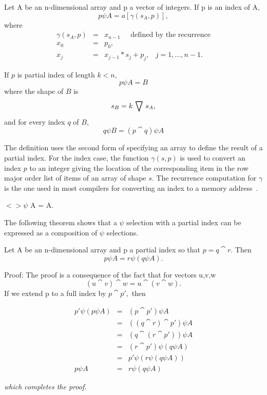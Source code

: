 \begin{definition}
Let A be an n-dimensional array and p a vector of integers.
If p is an index of A, 
\[             p \psi A = a[\gamma(s_A,p)], \]
   where 
\begin{eqnarray}
      \gamma(s_A,p) & = & x_{n-1}  \;\;\;\;\; \mbox{defined by 
the recurrence}    \nonumber \\ 
                 x_0 & = & p_0, \nonumber \\ 
              x_j & = & x_{j-1} * s_j + p_j, \; \; \; j=1,...,n-1. \nonumber
\end{eqnarray}

If $p$ is partial index of length $k < n,$
\[             p \psi A = B \]
where the shape of $B$ is
\[         s_B = k \,\bigtriangledown\, s_A,    \] 
and for every index $q$ of $B$,
\[         q \psi B = (p \cat q) \psi A \]
\end{definition}
The definition uses the second form of specifying an array to define the result
of a partial index. For the index case, the function $\gamma(s,p)$ 
is used to convert an index $p$ to an
integer giving the location of the corresponding item 
in the row major order list of items of an array of shape $s$. The
recurrence computation for $\gamma$ is the one used in most compilers 
for converting an
index to a memory address~\cite{djr}.

\begin{corollary}
$<> \psi$ A = A.
\end{corollary}

The following theorem shows that a $\psi$ selection with a partial index can
be expressed as a composition of $\psi$ selections.

\begin{theorem}
Let A be an n-dimensional array and p a partial index so 
that $p = q \cat r.$ Then
\[                 p \psi A = r \psi (q \psi A) . \]

Proof: The proof is a consequence of the fact that for vectors u,v,w
\[           (u \cat v) \cat w = u \cat (v \cat w). \]
If we extend p to a full index by $p \cat p',$ then

\begin{eqnarray}
             p' \psi (p \psi A) & = & (p \cat p') \psi A \nonumber \\
                             & = & ((q \cat r) \cat p') \psi A \nonumber \\
                             &  =  & (q \cat (r \cat p')) \psi A \nonumber \\
                            &  =  & (r \cat p') \psi (q \psi A) \nonumber \\
                            &   = & p' \psi ( r \psi (q \psi A)) \nonumber \\
                          p \psi A & = & r \psi (q \psi A) \nonumber                   
\end{eqnarray}

\end{theorem}
{\em which completes the proof.}

